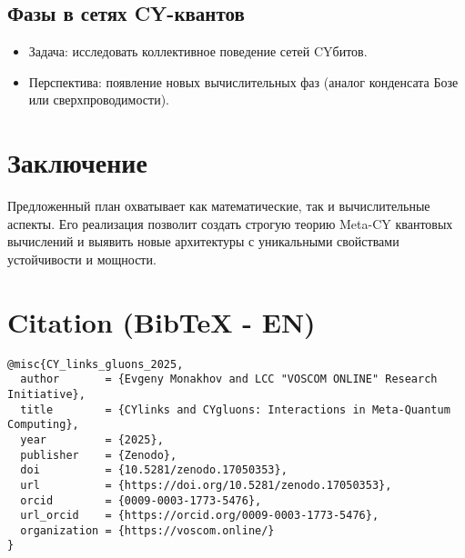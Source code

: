 \documentclass[12pt,a4paper]{article}
\begin{document}
\subsection{Фазы в сетях CY-квантов}
\begin{itemize}
\item Задача: исследовать коллективное поведение сетей CYбитов.  
\item Перспектива: появление новых вычислительных фаз (аналог конденсата Бозе или сверхпроводимости).  
\end{itemize}

\section{Заключение}
Предложенный план охватывает как математические, так и вычислительные аспекты.
Его реализация позволит создать строгую теорию Meta-CY квантовых вычислений
и выявить новые архитектуры с уникальными свойствами устойчивости и мощности.  

\section*{Citation (BibTeX - EN)}
\begin{verbatim}
@misc{CY_links_gluons_2025,
  author       = {Evgeny Monakhov and LCC "VOSCOM ONLINE" Research Initiative},
  title        = {CYlinks and CYgluons: Interactions in Meta-Quantum Computing},
  year         = {2025},
  publisher    = {Zenodo},
  doi          = {10.5281/zenodo.17050353},
  url          = {https://doi.org/10.5281/zenodo.17050353},
  orcid        = {0009-0003-1773-5476},
  url_orcid    = {https://orcid.org/0009-0003-1773-5476},
  organization = {https://voscom.online/}
}
\end{verbatim}
\end{document}
